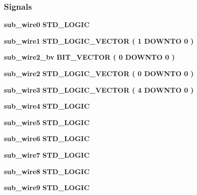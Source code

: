 \subsubsection*{Signals}
 \begin{DoxyCompactItemize}
\item 
{\bf sub\+\_\+wire0} {\bfseries \textcolor{comment}{S\+T\+D\+\_\+\+L\+O\+G\+IC}\textcolor{vhdlchar}{ }} 
\item 
{\bf sub\+\_\+wire1} {\bfseries \textcolor{comment}{S\+T\+D\+\_\+\+L\+O\+G\+I\+C\+\_\+\+V\+E\+C\+T\+OR}\textcolor{vhdlchar}{ }\textcolor{vhdlchar}{(}\textcolor{vhdlchar}{ }\textcolor{vhdlchar}{ } \textcolor{vhdldigit}{1} \textcolor{vhdlchar}{ }\textcolor{keywordflow}{D\+O\+W\+N\+TO}\textcolor{vhdlchar}{ }\textcolor{vhdlchar}{ } \textcolor{vhdldigit}{0} \textcolor{vhdlchar}{ }\textcolor{vhdlchar}{)}\textcolor{vhdlchar}{ }} 
\item 
{\bf sub\+\_\+wire2\+\_\+bv} {\bfseries \textcolor{comment}{B\+I\+T\+\_\+\+V\+E\+C\+T\+OR}\textcolor{vhdlchar}{ }\textcolor{vhdlchar}{(}\textcolor{vhdlchar}{ }\textcolor{vhdlchar}{ } \textcolor{vhdldigit}{0} \textcolor{vhdlchar}{ }\textcolor{keywordflow}{D\+O\+W\+N\+TO}\textcolor{vhdlchar}{ }\textcolor{vhdlchar}{ } \textcolor{vhdldigit}{0} \textcolor{vhdlchar}{ }\textcolor{vhdlchar}{)}\textcolor{vhdlchar}{ }} 
\item 
{\bf sub\+\_\+wire2} {\bfseries \textcolor{comment}{S\+T\+D\+\_\+\+L\+O\+G\+I\+C\+\_\+\+V\+E\+C\+T\+OR}\textcolor{vhdlchar}{ }\textcolor{vhdlchar}{(}\textcolor{vhdlchar}{ }\textcolor{vhdlchar}{ } \textcolor{vhdldigit}{0} \textcolor{vhdlchar}{ }\textcolor{keywordflow}{D\+O\+W\+N\+TO}\textcolor{vhdlchar}{ }\textcolor{vhdlchar}{ } \textcolor{vhdldigit}{0} \textcolor{vhdlchar}{ }\textcolor{vhdlchar}{)}\textcolor{vhdlchar}{ }} 
\item 
{\bf sub\+\_\+wire3} {\bfseries \textcolor{comment}{S\+T\+D\+\_\+\+L\+O\+G\+I\+C\+\_\+\+V\+E\+C\+T\+OR}\textcolor{vhdlchar}{ }\textcolor{vhdlchar}{(}\textcolor{vhdlchar}{ }\textcolor{vhdlchar}{ } \textcolor{vhdldigit}{4} \textcolor{vhdlchar}{ }\textcolor{keywordflow}{D\+O\+W\+N\+TO}\textcolor{vhdlchar}{ }\textcolor{vhdlchar}{ } \textcolor{vhdldigit}{0} \textcolor{vhdlchar}{ }\textcolor{vhdlchar}{)}\textcolor{vhdlchar}{ }} 
\item 
{\bf sub\+\_\+wire4} {\bfseries \textcolor{comment}{S\+T\+D\+\_\+\+L\+O\+G\+IC}\textcolor{vhdlchar}{ }} 
\item 
{\bf sub\+\_\+wire5} {\bfseries \textcolor{comment}{S\+T\+D\+\_\+\+L\+O\+G\+IC}\textcolor{vhdlchar}{ }} 
\item 
{\bf sub\+\_\+wire6} {\bfseries \textcolor{comment}{S\+T\+D\+\_\+\+L\+O\+G\+IC}\textcolor{vhdlchar}{ }} 
\item 
{\bf sub\+\_\+wire7} {\bfseries \textcolor{comment}{S\+T\+D\+\_\+\+L\+O\+G\+IC}\textcolor{vhdlchar}{ }} 
\item 
{\bf sub\+\_\+wire8} {\bfseries \textcolor{comment}{S\+T\+D\+\_\+\+L\+O\+G\+IC}\textcolor{vhdlchar}{ }} 
\item 
{\bf sub\+\_\+wire9} {\bfseries \textcolor{comment}{S\+T\+D\+\_\+\+L\+O\+G\+IC}\textcolor{vhdlchar}{ }} 
\end{DoxyCompactItemize}
